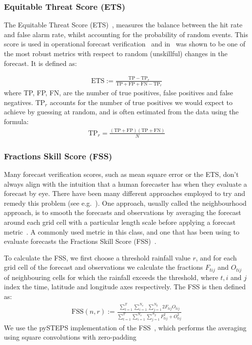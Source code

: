 \documentclass{article}
\begin{document}
\subsubsection{Equitable Threat Score (ETS)}
\label{sec:ets}

The Equitable Threat Score (ETS)~\citep{schaefer_critical_1990, wilks_forecast_2019}, measures the balance between the hit rate and false alarm rate, whilst accounting for the probability of random events. This score is used in operational forecast verification~\citep{mittermaier_long-term_2013} and in~\cite{manzato_behaviour_2017} was shown to be one of the most robust metrics with respect to random (unskillful) changes in the forecast. It is defined as:

\begin{align}
\label{eq:ets}
\text{ETS} := \frac{\text{TP} - \text{TP}_{r}}{\text{TP} + \text{FP} + \text{FN} - \text{TP}_{r}}
\end{align}
where TP, FP, FN, are the number of true positives, false positives and false negatives. $\text{TP}_{r}$ accounts for the number of true positives we would expect to achieve by guessing at random, and is often estimated from the data using the formula:
\begin{align}
    \text{TP}_{r} = \frac{(\text{TP} + \text{FP})(\text{TP} + \text{FN})}{N}
\end{align}

\subsubsection{Fractions Skill Score (FSS)}
\label{sec:fss}


Many forecast verification scores, such as mean square error or the ETS, don't always align with the intuition that a human forecaster has when they evaluate a forecast by eye. There have been many different approaches employed to try and remedy this problem (see e.g.~\cite{gilleland_intercomparison_2009}). One approach, usually called the neighbourhood approach, is to smooth the forecasts and observations by averaging the forecast around each grid cell with a particular length scale before applying a forecast metric~\citep{ebert_fuzzy_2008}. A commonly used metric in this class, and one that has been using to evaluate forecasts  the Fractions Skill Score (FSS)~\citep{roberts_assessing_2008, roberts_scale-selective_2008}.

To calculate the FSS, we first choose a threshold rainfall value $r$, and for each grid cell of the forecast and observations we calculate the fractions $F_{tij}$ and $O_{tij}$ of neighbouring cells for which the rainfall exceeds the threshold, where $t,i$ and $j$ index the time, latitude and longitude axes respectively. The FSS is then defined as:
\begin{align}
    \text{FSS}(n, r) := \frac{\sum_{t=1}^{T}\sum_{i=1}^{N_x} \sum_{j=1}^{N_y} 2 F_{tij}O_{tij}}{\sum_{t=1}^{T}\sum_{i=1}^{N_x}\sum_{j=1}^{N_y} F_{tij}^2 + O_{tij}^2 } \label{eq:fss_main}
\end{align}
We use the pySTEPS implementation of the FSS~\citep{pulkkinen_pysteps_2019}, which performs the averaging using square convolutions with zero-padding
\end{document}
